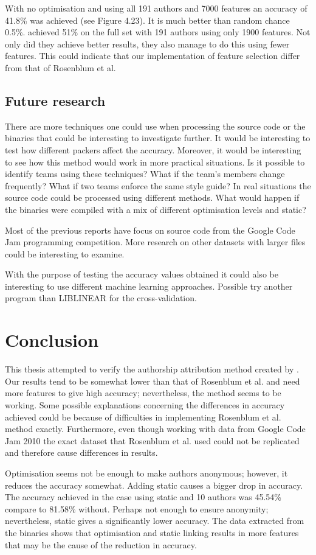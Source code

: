 \documentclass[a4paper,11pt]{kth-mag}
\begin{document}
With no optimisation and using all 191 authors and 7000 features an accuracy of
41.8\% was achieved (see Figure 4.23). It is much better than random chance
0.5\%. \parencite{rosenblum2011wrote} achieved 51\% on the full set with 191
authors using only 1900 features. Not only did they achieve better results,
they also manage to do this using fewer features. This could indicate that our
implementation of feature selection differ from that of Rosenblum et al.

\section{Future research}
There are more techniques one could use when processing the source code or the
binaries that could be interesting to investigate further. It would be
interesting to test how different packers affect the accuracy. Moreover, it
would be interesting to see how this method would work in more practical
situations. Is it possible to identify teams using these techniques? What if
the team’s members change frequently? What if two teams enforce the same style
guide? In real situations the source code could be processed using different methods.
What would happen if the binaries were compiled with a mix of different
optimisation levels and static?  

Most of the previous reports have focus on source code from the Google Code Jam
programming competition. More research on other datasets with larger files
could be interesting to examine.

With the purpose of testing the accuracy values obtained it could also be
interesting to use different machine learning approaches. Possible try another
program than LIBLINEAR for the cross-validation.

\chapter{Conclusion}
This thesis attempted to verify the authorship attribution method created by
\parencite{rosenblum2011wrote}. Our results tend to be somewhat lower than that
of Rosenblum et al. and need more features to give high accuracy; nevertheless,
the method seems to be working. Some possible explanations concerning the
differences in accuracy achieved could be because of difficulties in
implementing Rosenblum et al. method exactly. Furthermore, even though working
with data from Google Code Jam 2010 the exact dataset that Rosenblum et al.
used could not be replicated and therefore cause differences in results. 

Optimisation seems not be enough to make authors anonymous; however, it reduces
the accuracy somewhat. Adding static causes a bigger drop in accuracy. The
accuracy achieved in the case using static and 10 authors was 45.54\% compare
to 81.58\% without. Perhaps not enough to ensure anonymity; nevertheless,
static gives a significantly lower accuracy. The data extracted from the binaries shows that
optimisation and static linking results in more features that may be the cause
of the reduction in accuracy.

\printbibliography
\end{document}
